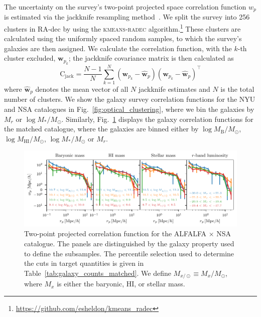 \documentclass[usenatbib,useAMS]{mnras}
\newcommand{\HI}{\ensuremath{\mathrm{H}\scriptstyle\mathrm{I}}}
\newcommand{\matched}{ALFALFA $\times$ NSA }
\begin{document}
The uncertainty on the survey's two-point projected space correlation function $w_p$ is estimated via the jackknife resampling method~\citep{Norberg_et_al}. We split the survey into 256 clusters in RA-dec by using the \textsc{kmeans-radec} algorithm.\footnote{\url{https://github.com/esheldon/kmeans_radec}} These clusters are calculated using the uniformly spaced random samples, to which the survey's galaxies are then assigned. We calculate the correlation function, with the $k$-th cluster excluded, $\bm{w}_{p_k}$; the jackknife covariance matrix is then calculated as
%
\begin{equation}\label{eq:jackknife}
    \bm{\mathrm{C}}_{\mathrm{jack}}
    =
    \frac{N - 1}{N}
    \sum_{k=1}^{N}
    \left(\bm{w}_{p_k} - \widehat{\bm{w}}_{p}\right)
    \left(\bm{w}_{p_k} - \widehat{\bm{w}}_{p}\right)^\intercal
\end{equation}
%
where $\widehat{\bm{w}}_{p}$ denotes the mean vector of all $N$ jackknife estimates and $N$ is the total number of clusters.
We show the galaxy survey correlation functions for the \ac{NYU} and \ac{NSA} catalogues in Fig.~\ref{fig:optical_clustering}, where we bin the galaxies by $M_r$ or $\log M_*/M_\odot$. Similarly, Fig.~\ref{fig:HI_clustering} displays the galaxy correlation functions for the matched catalogue, where the galaxies are binned either by $\log M_\mathrm{B}/M_\odot$, $\log M_{\HI}/M_\odot$, $\log M_*/M_\odot$ or $M_r$.

\begin{figure}
    \centering
    \includegraphics[width=1.0\textwidth]{Figures/HI_clustering.pdf}
    \caption{Two-point projected correlation function for the \matched catalogue. The panels are distinguished by the galaxy property used to define the subsamples. The percentile selection used to determine the cuts in target quantities is given in Table~\ref{tab:galaxy_counts_matched}. We define $M_{x / \odot} \equiv M_x / M_\odot$, where $M_x$ is either the baryonic, $\HI$, or stellar mass.}
    \label{fig:HI_clustering}
\end{figure}
\end{document}
